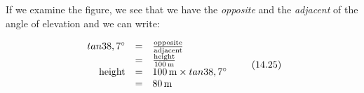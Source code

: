         \label{m39411*id81702}If we examine the figure, we see that we have the \textsl{opposite} and the \textsl{adjacent} of the angle of elevation and we can write:\par 
        \label{m39411*id81717}\nopagebreak\noindent{}
    \begin{equation}
    \begin{array}{ccc}\hfill tan38,{7}^{\circ }& =& \frac{\mathrm{opposite}}{\mathrm{adjacent}}\hfill \\ & =& \frac{\mathrm{height}}{100\phantom{\rule{0.166667em}{0ex}}\mathrm{m}}\hfill \\ \hfill \mathrm{height}& =& 100\phantom{\rule{0.166667em}{0ex}}\mathrm{m}\ensuremath{\times}tan38,{7}^{\circ }\hfill \\ & =& 80\phantom{\rule{0.166667em}{0ex}}\mathrm{m}\hfill \end{array}\tag{14.25}
      \end{equation}
\par
            \label{m39411*secfhsst!!!underscore!!!id1381}\vspace{.5cm} 
      \noindent
